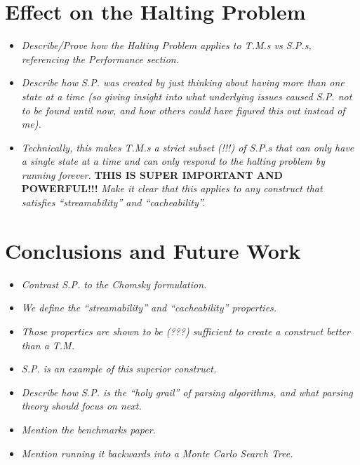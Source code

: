 \documentclass{article}
\begin{document}
\section{Effect on the Halting Problem}
\begin{itemize}
  \item \textit{Describe/Prove how the Halting Problem applies to T.M.s vs S.P.s, referencing the Performance section.}
  \item \textit{Describe how S.P. was created by just thinking about having more than one state at a time (so giving insight into what underlying issues caused S.P. not to be found until now, and how others could have figured this out instead of me).}
  \item \textit{Technically, this makes T.M.s a strict subset (!!!) of S.P.s that can only have a single state at a time and can only respond to the halting problem by running forever.} \textbf{THIS IS SUPER IMPORTANT AND POWERFUL!!!} \textit{Make it clear that this applies to any construct that satisfies ``streamability'' and ``cacheability''.}
\end{itemize}

\section{Conclusions and Future Work}
\begin{itemize}
  \item \textit{Contrast S.P. to the Chomsky formulation.}
  \item \textit{We define the ``streamability'' and ``cacheability'' properties.}
  \item \textit{Those properties are shown to be (???) sufficient to create a construct better than a T.M.}
  \item \textit{S.P. is an example of this superior construct.}
  \item \textit{Describe how S.P. is the ``holy grail'' of parsing algorithms, and what parsing theory should focus on next.}
  \item \textit{Mention the benchmarks paper.}
  \item \textit{Mention running it backwards into a Monte Carlo Search Tree.}
\end{itemize}
\end{document}
